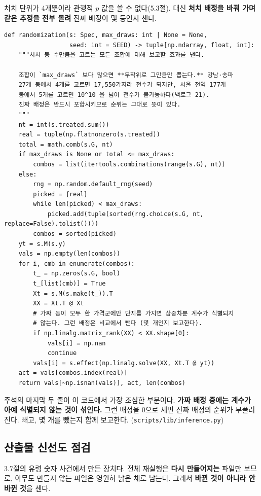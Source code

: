처치 단위가 4개뿐이라 관행적 $p$ 값을 쓸 수 없다(5.3절). 대신 \textbf{처치
배정을 바꿔 가며 같은 추정을 전부 돌려} 진짜 배정이 몇 등인지 센다.

\begin{footnotesize}
\begin{verbatim}
def randomization(s: Spec, max_draws: int | None = None,
                  seed: int = SEED) -> tuple[np.ndarray, float, int]:
    """처치 동 수만큼을 고르는 모든 조합에 대해 보고할 효과를 낸다.

    조합이 `max_draws` 보다 많으면 **무작위로 그만큼만 뽑는다.** 강남·송파
    27개 동에서 4개를 고르면 17,550가지라 전수가 되지만, 서울 전역 177개
    동에서 5개를 고르면 10^10 을 넘어 전수가 불가능하다(백로그 21).
    진짜 배정은 반드시 포함시키므로 순위는 그대로 뜻이 있다.
    """
    nt = int(s.treated.sum())
    real = tuple(np.flatnonzero(s.treated))
    total = math.comb(s.G, nt)
    if max_draws is None or total <= max_draws:
        combos = list(itertools.combinations(range(s.G), nt))
    else:
        rng = np.random.default_rng(seed)
        picked = {real}
        while len(picked) < max_draws:
            picked.add(tuple(sorted(rng.choice(s.G, nt, replace=False).tolist())))
        combos = sorted(picked)
    yt = s.M(s.y)
    vals = np.empty(len(combos))
    for i, cmb in enumerate(combos):
        t_ = np.zeros(s.G, bool)
        t_[list(cmb)] = True
        Xt = s.M(s.make(t_)).T
        XX = Xt.T @ Xt
        # 가짜 동이 모두 한 가격군에만 단지를 가지면 삼중차분 계수가 식별되지
        # 않는다. 그런 배정은 비교에서 뺀다 (몇 개인지 보고한다).
        if np.linalg.matrix_rank(XX) < XX.shape[0]:
            vals[i] = np.nan
            continue
        vals[i] = s.effect(np.linalg.solve(XX, Xt.T @ yt))
    act = vals[combos.index(real)]
    return vals[~np.isnan(vals)], act, len(combos)
\end{verbatim}
\end{footnotesize}

주석의 마지막 두 줄이 이 코드에서 가장 조심한 부분이다. \textbf{가짜 배정 중에는
계수가 아예 식별되지 않는 것이 섞인다.} 그런 배정을 0으로 세면 진짜 배정의
순위가 부풀려진다. 빼고, 몇 개를 뺐는지 함께 보고한다.
(\texttt{scripts/lib/inference.py})

\subsection{산출물 신선도 점검}

3.7절의 유령 숫자 사건에서 만든 장치다. 전체 재실행은 \textbf{다시 만들어지는}
파일만 보므로, 아무도 만들지 않는 파일은 영원히 낡은 채로 남는다. 그래서
\textbf{바뀐 것이 아니라 안 바뀐 것}을 센다.

